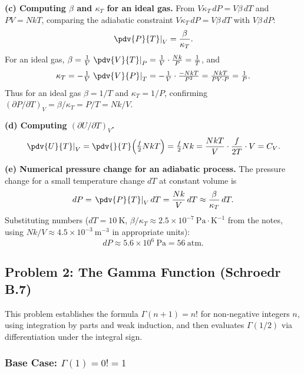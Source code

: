 \textbf{(c) Computing $\beta$ and $\kappa_T$ for an ideal gas.}
From $V\kappa_T\,dP = V\beta\,dT$ and $PV = NkT$, comparing the adiabatic constraint $V\kappa_T\,dP = V\beta\,dT$ with $V\beta\,dP$:
\begin{equation}
    \left.\pdv{P}{T}\right|_V = \frac{\beta}{\kappa_T}.
\end{equation}
For an ideal gas, $\beta = \tfrac{1}{V}\left.\pdv{V}{T}\right|_P = \tfrac{1}{V}\cdot\tfrac{Nk}{P} = \tfrac{1}{T}$, and
\begin{equation}
    \kappa_T = -\tfrac{1}{V}\left.\pdv{V}{P}\right|_T = -\tfrac{1}{V}\cdot\tfrac{-NkT}{P^2} = \tfrac{NkT}{PV\cdot P} = \tfrac{1}{P}.
\end{equation}
Thus for an ideal gas $\beta = 1/T$ and $\kappa_T = 1/P$, confirming $(\partial P/\partial T)_V = \beta/\kappa_T = P/T = Nk/V$.

\textbf{(d) Computing $(\partial U/\partial T)_V$.}
\begin{equation}
    \left.\pdv{U}{T}\right|_V = \pdv{}{T}\!\left(\tfrac{f}{2}NkT\right) = \tfrac{f}{2}Nk = \frac{NkT}{V}\cdot\frac{f}{2T}\cdot V = C_V.
\end{equation}

\textbf{(e) Numerical pressure change for an adiabatic process.}
The pressure change for a small temperature change $dT$ at constant volume is
\begin{equation}
    dP = \left.\pdv{P}{T}\right|_V dT = \frac{Nk}{V}\,dT \approx \frac{\beta}{\kappa_T}\,dT.
\end{equation}
Substituting numbers ($dT = 10\ \text{K}$, $\beta/\kappa_T \approx 2.5\times 10^{-7}\ \text{Pa}\cdot\text{K}^{-1}$ from the notes, using $Nk/V \approx 4.5\times 10^{-3}\ \text{m}^{-3}$ in appropriate units):
\begin{equation}
    dP \approx 5.6\times 10^6\ \text{Pa} = 56\ \text{atm}.
\end{equation}

\subsection{Problem 2: The Gamma Function (Schroedr B.7)}

This problem establishes the formula $\Gamma(n+1) = n!$ for non-negative integers $n$, using integration by parts and weak induction, and then evaluates $\Gamma(1/2)$ via differentiation under the integral sign.

\subsubsection{Base Case: $\Gamma(1) = 0! = 1$}

